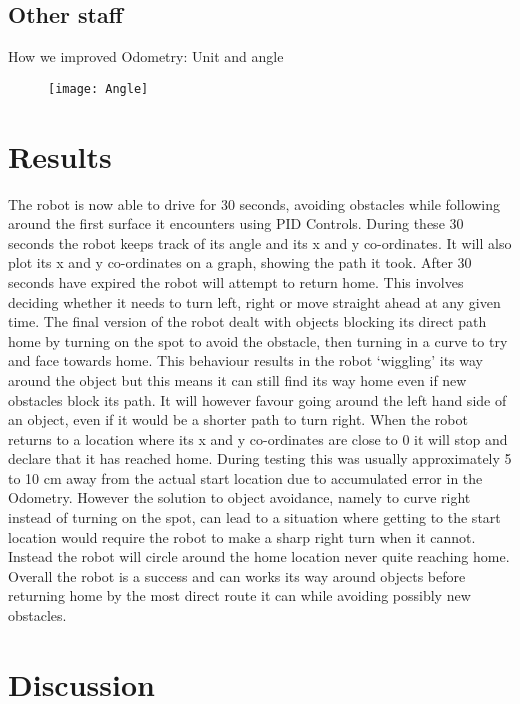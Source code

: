 \documentclass[]{article}
\begin{document}
\subsection{Other staff}
How we improved Odometry: Unit and angle

\begin{figure}
\centering
\texttt{[image: Angle]}
\end{figure}




\section{Results}
The robot is now able to drive for 30 seconds, avoiding obstacles while following around the first surface it encounters using PID Controls. During these 30 seconds the robot keeps track of its angle and its x and y co-ordinates. It will also plot its x and y co-ordinates on a graph, showing the path it took. After 30 seconds have expired the robot will attempt to return home. This involves deciding whether it needs to turn left, right or move straight ahead at any given time. The final version of the robot dealt with objects blocking its direct path home by turning on the spot to avoid the obstacle, then turning in a curve to try and face towards home. This behaviour results in the robot ‘wiggling’ its way around the object but this means it can still find its way home even if new obstacles block its path. It will however favour going around the left hand side of an object, even if it would be a shorter path to turn right. When the robot returns to a location where its x and y co-ordinates are close to 0 it will stop and declare that it has reached home. During testing this was usually approximately 5 to 10 cm away from the actual start location due to accumulated error in the Odometry. However the solution to object avoidance, namely to curve right instead of turning on the spot, can lead to a situation where getting to the start location would require the robot to make a sharp right turn when it cannot. Instead the robot will circle around the home location never quite reaching home. Overall the robot is a success and can works its way around objects before returning home by the most direct route it can while avoiding possibly new obstacles. 	

\section{Discussion}
\end{document}
